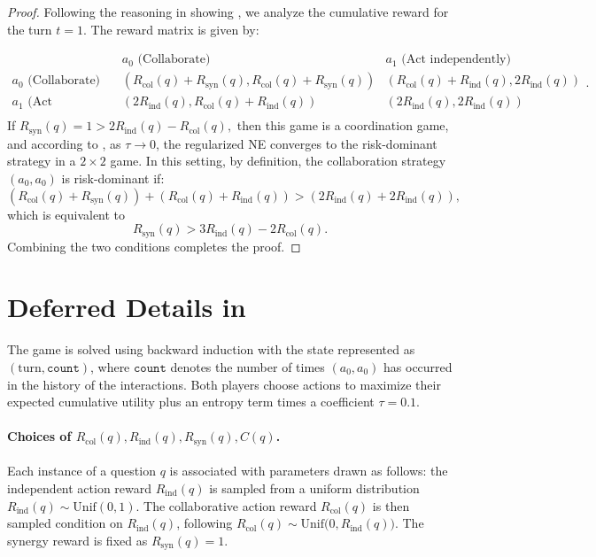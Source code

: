 \begin{proof}
Following the reasoning in showing  , we analyze the cumulative reward for the turn $t=1$. The reward matrix is given by:

\[
\begin{array}{c|cc}
 & a_0 \text{ (Collaborate)} & a_1 \text{ (Act independently)} \\ \hline
a_0 \text{ (Collaborate)} & (R_{\text{col}}(q) + R_{\text{syn}}(q), R_{\text{col}}(q) + R_{\text{syn}}(q)) & (R_{\text{col}}(q) + R_{\text{ind}}(q), 2R_{\text{ind}}(q)) \\
a_1 \text{ (Act independently)} & (2R_{\text{ind}}(q), R_{\text{col}}(q) + R_{\text{ind}}(q)) & (2R_{\text{ind}}(q), 2R_{\text{ind}}(q)) \\
\end{array}.
\]
If $R_{\text{syn}}(q) = 1 > 2R_{\text{ind}}(q) - R_{\text{col}}(q),$ then this game is a coordination game, and according to \citet[Theorem 1]{zhang2016quantal},
as \(\tau \to 0\), the regularized NE converges to the risk-dominant strategy \citep{harsanyi1988general} in a \(2 \times 2\) game. In this setting, {by definition,} the collaboration strategy \((a_0, a_0)\) is risk-dominant  \citep{harsanyi1988general} if:
\[
(R_{\text{col}}(q) + R_{\text{syn}}(q)) + (R_{\text{col}}(q) + R_{\text{ind}}(q)) > (2R_{\text{ind}}(q) + 2R_{\text{ind}}(q)),
\]
which is equivalent to 
\[
R_{\text{syn}}(q)  > 3R_{\text{ind}}(q) - 2R_{\text{col}}(q).
\]
Combining the two conditions completes the proof. 
\end{proof}

\section{Deferred Details in }
\label{appendix:toy}


The game is solved using backward induction with the state represented as \((\text{turn}, \texttt{count})\), where \(\texttt{count}\) denotes the number of times \((a_0, a_0)\) has occurred in the history of the interactions. Both players choose actions to maximize their expected cumulative utility plus an entropy term times a coefficient \(\tau = 0.1\).


\paragraph{Choices of $R_{\text{col}}(q), R_{\text{ind}}(q), R_{\text{syn}}(q), C(q)$. } Each instance of a question \(q\) is associated with parameters drawn as follows: the independent action reward \( R_{\text{ind}}(q) \) is sampled from a uniform distribution \( R_{\text{ind}}(q) \sim \text{Unif}(0, 1) \). The collaborative action reward \( R_{\text{col}}(q) \) is then sampled condition on \( R_{\text{ind}}(q) \), following \( R_{\text{col}}(q) \sim \text{Unif}\Big(0, R_{\text{ind}}(q)\Big) \). The synergy reward is fixed as \( R_{\text{syn}}(q) = 1 \).

